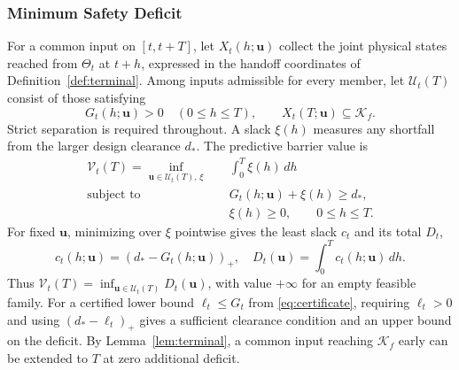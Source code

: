\documentclass[journal]{IEEEtran}
\theoremstyle{definition}
\newcommand{\vct}[1]{\boldsymbol{#1}}
\begin{document}
\subsubsection{Minimum Safety Deficit}
For a common input on $[t,t+T]$, let $X_t(h;\vct u)$ collect the
joint physical states reached from $\Theta_t$ at $t+h$, expressed in
the handoff coordinates of Definition~\ref{def:terminal}. Among inputs
admissible for every member, let $\mathcal U_t(T)$ consist of those
satisfying
\begin{equation*}
 G_t(h;\vct u)>0\quad(0\le h\le T),\qquad
 X_t(T;\vct u)\subseteq\mathcal K_f .
\end{equation*}
Strict separation is required throughout. A slack $\xi(h)$ measures
any shortfall from the larger design clearance $d_*$. The predictive
barrier value \cite{HuangWangMargellosGoulart2025} is
\begin{equation}\label{eq:barrier}
\begin{aligned}
 \mathcal V_t(T)=
 \inf_{\vct u\in\mathcal U_t(T),\,\xi}\quad
       &\int_0^T\xi(h)\,dh\\
 \text{subject to}\quad
       &G_t(h;\vct u)+\xi(h)\ge d_*,\\
       &\xi(h)\ge0,\qquad 0\le h\le T .
\end{aligned}
\end{equation}
For fixed $\vct u$, minimizing over $\xi$ pointwise gives the least
slack $c_t$ and its total $D_t$,
\begin{equation}\label{eq:deficit}
 c_t(h;\vct u)=(d_*-G_t(h;\vct u))_+,\quad
 D_t(\vct u)=\int_0^T c_t(h;\vct u)\,dh .
\end{equation}
Thus $\mathcal V_t(T)=\inf_{\vct u\in\mathcal U_t(T)}D_t(\vct u)$,
with value $+\infty$ for an empty feasible family. For a certified
lower bound $\ell_t\le G_t$ from \eqref{eq:certificate}, requiring
$\ell_t>0$ and using $(d_*-\ell_t)_+$ gives a sufficient clearance
condition and an upper bound on the deficit. By Lemma~\ref{lem:terminal},
a common input reaching $\mathcal K_f$ early can be extended to $T$ at
zero additional deficit.
\end{document}
